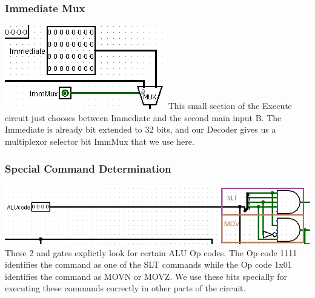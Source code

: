 \documentclass{article}
\begin{document}
\subsubsection{Immediate Mux}
\includegraphics{Immediate.png}
This small section of the Execute circuit just chooses between Immediate and the second main input B. The Immediate is already bit extended to 32 bits, and our Decoder gives us a multiplexor selector bit ImmMux that we use here. 

\subsubsection{Special Command Determination}
\includegraphics{Code.png}
These 2 and gates explictly look for certain ALU Op codes. The Op code 1111 identifies the command as one of the SLT commands while the Op code 1x01 identifies the command as MOVN or MOVZ. We use these bits specially for executing these commands correctly in other parts of the circuit.
\end{document}
